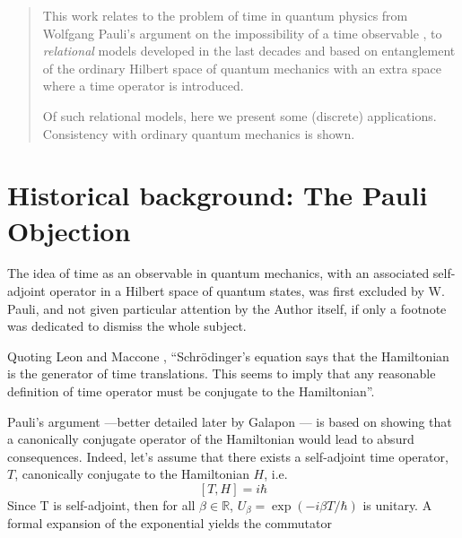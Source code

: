 \documentclass[a0,portrait]{a0poster}
\begin{document}
\begin{multicols}{2} %


\color{Navy} %

\begin{abstract}
\large\noindent %
This work relates to the problem of time in quantum physics
\cite{TQM1, TQM2}
from Wolfgang Pauli's argument
on the impossibility of a time observable \cite{PauliFootnote},
to \emph{relational} models developed in the last decades
\cite{PageWootters, Lloyd:Time}
and based
on entanglement of the ordinary Hilbert space of quantum mechanics
with an extra space where a time operator is introduced.

Of such relational models, here we present some (discrete) applications.
Consistency with ordinary quantum mechanics is shown.
\end{abstract}

\setlength{\parindent}{1.5em} %


\color{SaddleBrown} %

\section*{Historical background: The Pauli Objection}
The idea of time as an observable in quantum mechanics,
with an associated self-adjoint operator in a Hilbert space of quantum states,
was first excluded by W. Pauli,
and not given particular attention by the Author itself,
if only a footnote was dedicated to dismiss the whole subject. \cite{PauliFootnote}

Quoting Leon and Maccone \cite{Maccone:Pauli},
``Schr\"odinger's equation says that the Hamiltonian is the generator of time translations. This seems
to imply that any reasonable definition of time operator must be conjugate to the Hamiltonian''.
  
Pauli's argument ---better detailed later by Galapon \cite{Galapon2002}---
is based on showing that a canonically conjugate operator of the Hamiltonian
would lead to absurd consequences.
Indeed, let's assume that there exists a self-adjoint time operator, $T$, canonically conjugate
to the Hamiltonian $H$, i.e.
\begin{equation}
\label{THcommutator}
[T, H] = i\hbar
\end{equation}
Since T is self-adjoint, then for all
$\beta\in\mathbb{R}$, $U_{\beta} = \exp(- i \beta T / \hbar)$
is unitary. A formal
expansion of the exponential yields the commutator


\end{multicols}
\end{document}
